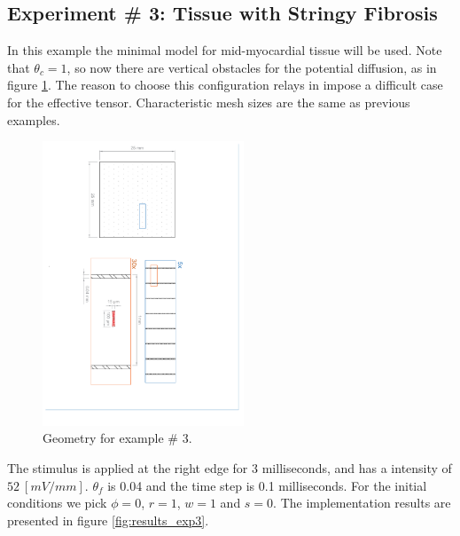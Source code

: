 \subsection{Experiment \# 3: Tissue with Stringy Fibrosis}

In this example the minimal model for mid-myocardial tissue will be used. Note that $\theta_c = 1$, so now there are vertical obstacles for the potential diffusion, as in figure \ref{fig:ex3_geo}. The reason to choose this configuration relays in impose a difficult case for the effective tensor. Characteristic mesh sizes are the same as previous examples.

\begin{figure}[!htbp]
\centering
\includegraphics[trim={4.1cm 2cm 6cm 0.5cm}, clip, width = 6cm, angle = 90]{fig/Numerical_Experiments/ex3/geometry}
\caption{Geometry for example \# 3.} \label{fig:ex3_geo}
\end{figure}

The stimulus is applied at the right edge for 3 milliseconds, and has a intensity of $52~[mV/mm]$. $\theta_f$ is 0.04 and the time step is 0.1 milliseconds. For the initial conditions we pick $\phi = 0$, $r = 1$, $w = 1$ and $s = 0$. The implementation results are presented in figure \ref{fig:results_exp3}.

